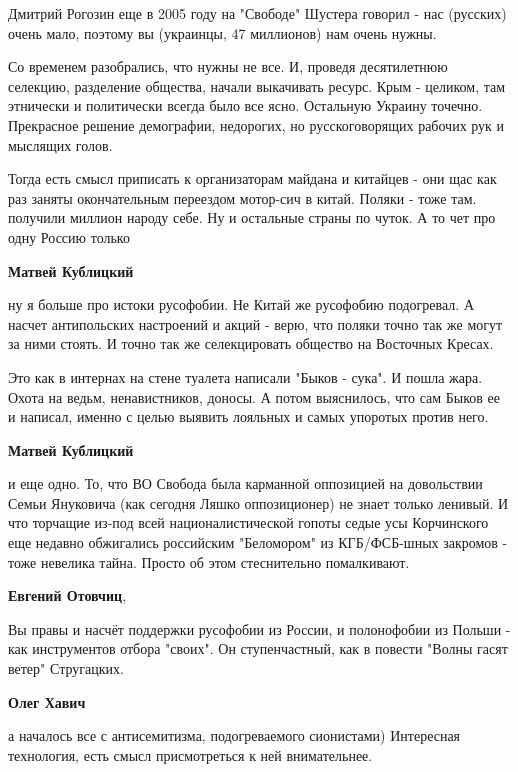 \begin{itemize}
Дмитрий Рогозин еще в 2005 году на "Свободе" Шустера говорил - нас (русских)
очень мало, поэтому вы (украинцы, 47 миллионов) нам очень нужны.

Со временем разобрались, что нужны не все. И, проведя десятилетнюю селекцию,
разделение общества, начали выкачивать ресурс. Крым - целиком, там этнически и
политически всегда было все ясно. Остальную Украину точечно. Прекрасное решение
демографии, недорогих, но русскоговорящих рабочих рук и мыслящих голов.

\begin{itemize} %

Тогда есть смысл приписать к организаторам майдана и китайцев - они щас как раз
заняты окончательным переездом мотор-сич в китай. Поляки - тоже там. получили
миллион народу себе. Ну и остальные страны по чуток. А то чет про одну Россию
только

\textbf{Матвей Кублицкий} 

ну я больше про истоки русофобии. Не Китай же русофобию подогревал. А насчет
антипольских настроений и акций - верю, что поляки точно так же могут за ними
стоять. И точно так же селекцировать общество на Восточных Кресах.

Это как в интернах на стене туалета написали "Быков - сука". И пошла жара.
Охота на ведьм, ненавистников, доносы. А потом выяснилось, что сам Быков ее и
написал, именно с целью выявить лояльных и самых упоротых против него.

\textbf{Матвей Кублицкий} 

и еще одно. То, что ВО Свобода была карманной оппозицией на довольствии Семьи
Януковича (как сегодня Ляшко оппозиционер) не знает только ленивый. И что
торчащие из-под всей националистической гопоты седые усы Корчинского еще
недавно обжигались российским "Беломором" из КГБ/ФСБ-шных закромов - тоже
невелика тайна. Просто об этом стеснительно помалкивают.

\textbf{Евгений Отовчиц}, 

Вы правы и насчёт поддержки русофобии из России, и полонофобии из Польши - как
инструментов отбора "своих". Он ступенчастный, как в повести "Волны гасят
ветер" Стругацких.

\textbf{Олег Хавич} 

а началось все с антисемитизма, подогреваемого сионистами) Интересная
технология, есть смысл присмотреться к ней внимательнее.


\end{itemize}
\end{itemize}
